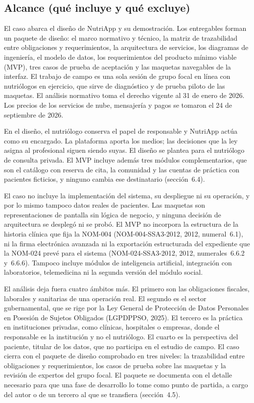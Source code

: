 \documentclass[12pt, a4paper]{article}
\begin{document}
\subsection{Alcance (qué incluye y qué excluye)}
El caso abarca el diseño de NutriApp y su demostración. Los
entregables forman un paquete de diseño: el marco normativo y técnico,
la matriz de trazabilidad entre obligaciones y requerimientos, la
arquitectura de servicios, los diagramas de ingeniería, el modelo de
datos, los requerimientos del producto mínimo viable (MVP), tres casos
de prueba de aceptación y las maquetas navegables de la interfaz. El
trabajo de campo es una sola sesión de grupo focal en línea con
nutriólogos en ejercicio, que sirve de diagnóstico y de prueba piloto
de las maquetas. El análisis normativo toma el derecho vigente al 31
de enero de 2026. Los precios de los servicios de nube, mensajería y
pagos se tomaron el 24 de septiembre de 2026.
 
En el diseño, el nutriólogo conserva el papel de responsable y NutriApp
actúa como su encargado. La plataforma aporta los medios; las
decisiones que la ley asigna al profesional siguen siendo suyas. El
diseño se plantea para el nutriólogo de consulta privada. El MVP
incluye además tres módulos complementarios, que son el catálogo con
reserva de cita, la comunidad y las cuentas de práctica con pacientes
ficticios, y ninguno cambia ese destinatario (sección~6.4).
 
El caso no incluye la implementación del sistema, su despliegue ni su
operación, y por lo mismo tampoco datos reales de pacientes. Las
maquetas son representaciones de pantalla sin lógica de negocio, y
ninguna decisión de arquitectura se desplegó ni se probó. El MVP no
incorpora la estructura de la historia clínica que fija la NOM-004
(NOM-004-SSA3-2012, 2012, numeral~6.1), ni la firma electrónica avanzada
ni la exportación estructurada del expediente que la NOM-024 prevé para
el sistema (NOM-024-SSA3-2012, 2012, numerales~6.6.2 y~6.6.6). Tampoco
incluye módulos de inteligencia artificial, integración con
laboratorios, telemedicina ni la segunda versión del módulo social.
 
El análisis deja fuera cuatro ámbitos más. El primero son las obligaciones
fiscales, laborales y sanitarias de una operación real. El segundo es el
sector gubernamental, que se rige por la Ley General de Protección de
Datos Personales en Posesión de Sujetos Obligados (LGPDPPSO, 2025). El
tercero es la práctica en instituciones privadas, como clínicas,
hospitales o empresas, donde el responsable es la institución y no el
nutriólogo. El cuarto es la perspectiva del paciente, titular de los
datos, que no participa en el estudio de campo. El caso cierra con el paquete de
diseño comprobado en tres niveles: la trazabilidad entre obligaciones y
requerimientos, los casos de prueba sobre las maquetas y la revisión de
expertos del grupo focal. El paquete se documenta con el detalle
necesario para que una fase de desarrollo lo tome como punto de partida,
a cargo del autor o de un tercero al que se transfiera (sección~4.5).
\end{document}
